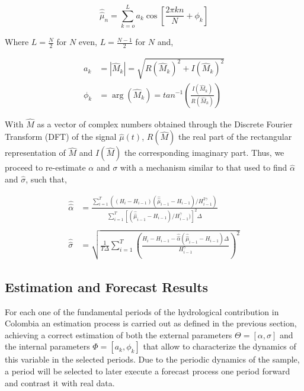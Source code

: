 \documentclass[12pt,halfline,a4paper]{ouparticle}
\begin{document}
\begin{equation}
\label{representation}
\hat{\hat{\mu}}_{n}=\sum_{k=o}^{L}a_{k}\cos\left[\frac{2\pi kn}{N}+\phi_{k}\right]
\end{equation}

Where $L=\frac{N}{2}$ for $N$ even, $L=\frac{N-1}{2}$ for $N$ and,

\begin{equation*}
\begin{split}
a_{k}&=\left|\hat{M}_{k}\right|=\sqrt{R(\hat{M}_{k})^{2}+I(\hat{M}_{k})^{2}}\\
\phi_{k}&=\arg(\hat{M}_{k})=tan^{-1}\left(\frac{I(\hat{M}_{k})}{R(\hat{M}_{k})}\right)
\end{split}
\end{equation*} 

With $\hat{M}$ as a vector of complex numbers obtained through the Discrete Fourier Transform (DFT) of the signal $\hat{\mu}(t)$, $R(\hat{M})$ the real part of the rectangular representation of $\hat{M}$ and $I(\hat{M})$ the corresponding imaginary part. Thus, we proceed to re-estimate $\alpha$ and $\sigma$ with a mechanism similar to that used to find $\hat{\alpha}$ and $\hat{\sigma}$, such that,

\begin{equation*}
\begin{split}
\hat{\hat{\alpha}}&=\frac{\sum_{i=1}^{T}\left((H_{i}-H_{i-1})(\hat{\hat{\mu}}_{i-1}-H_{i-1})/H_{i-1}^{2\gamma}\right)}{\sum_{i=1}^{T}\left[(\hat{\hat{\mu}}_{i-1}-H_{i-1})/H_{i-1}^{\gamma})\right]^{2}\Delta}\\
\\
\hat{\hat{\sigma}}&=\sqrt{\frac{1}{T\Delta}\sum_{i=1}^{T}\left(\frac{H_{i}-H_{i-1}-\hat{\hat{\alpha}}(\hat{\hat{\mu}}_{i-1}-H_{i-1})\Delta}{H_{i-1}^{\gamma}}\right)^{2}}
\end{split}
\end{equation*}

\subsection{Estimation and Forecast Results}

For each one of the fundamental periods of the hydrological contribution in Colombia an estimation process is carried out as defined in the previous section, achieving a correct estimation of both the external parameters $\Theta=[\alpha,\sigma]$ and the internal parameters $\Phi=[a_{k},\phi_{k}]$ that allow to characterize the dynamics of this variable in the selected periods. Due to the periodic dynamics of the sample, a period will be selected to later execute a forecast process one period forward and contrast it with real data.
\end{document}
